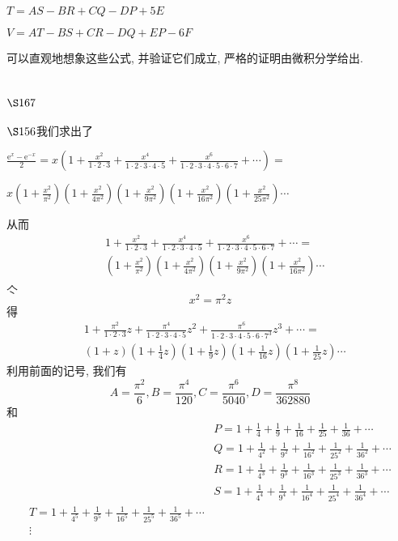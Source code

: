 $T=A S-B R+C Q-D P+5 E$

$V=A T-B S+C R-D Q+E P-6 F$

可以直观地想象这些公式, 并验证它们成立, 严格的证明由微积分学给出.

\section{$\S 167$}

$\S 156$我们求出了

$\frac{\mathrm{e}^{x}-\mathrm{e}^{-x}}{2}=x\left(1+\frac{x^{2}}{1 \cdot 2 \cdot 3}+\frac{x^{4}}{1 \cdot 2 \cdot 3 \cdot 4 \cdot 5}+\frac{x^{6}}{1 \cdot 2 \cdot 3 \cdot 4 \cdot 5 \cdot 6 \cdot 7}+\cdots\right)=$

$x\left(1+\frac{x^{2}}{\pi^{2}}\right)\left(1+\frac{x^{2}}{4 \pi^{2}}\right)\left(1+\frac{x^{2}}{9 \pi^{2}}\right)\left(1+\frac{x^{2}}{16 \pi^{2}}\right)\left(1+\frac{x^{2}}{25 \pi^{2}}\right) \cdots$

从而
\[
\begin{aligned}
& 1+\frac{x^{2}}{1 \cdot 2 \cdot 3}+\frac{x^{4}}{1 \cdot 2 \cdot 3 \cdot 4 \cdot 5}+\frac{x^{6}}{1 \cdot 2 \cdot 3 \cdot 4 \cdot 5 \cdot 6 \cdot 7}+\cdots= \\
& \left(1+\frac{x^{2}}{\pi^{2}}\right)\left(1+\frac{x^{2}}{4 \pi^{2}}\right)\left(1+\frac{x^{2}}{9 \pi^{2}}\right)\left(1+\frac{x^{2}}{16 \pi^{2}}\right) \cdots
\end{aligned}
\]
$\hat{亽}$
\[
x^{2}=\pi^{2} z
\]
得
\[
\begin{aligned}
& 1+\frac{\pi^{2}}{1 \cdot 2 \cdot 3} z+\frac{\pi^{4}}{1 \cdot 2 \cdot 3 \cdot 4 \cdot 5} z^{2}+\frac{\pi^{6}}{1 \cdot 2 \cdot 3 \cdot 4 \cdot 5 \cdot 6 \cdot 7^{3}} z^{3}+\cdots= \\
& (1+z)\left(1+\frac{1}{4} z\right)\left(1+\frac{1}{9} z\right)\left(1+\frac{1}{16} z\right)\left(1+\frac{1}{25} z\right) \cdots
\end{aligned}
\]
利用前面的记号, 我们有
\[
A=\frac{\pi^{2}}{6}, B=\frac{\pi^{4}}{120}, C=\frac{\pi^{6}}{5040}, D=\frac{\pi^{8}}{362880}
\]
和
\[
\begin{aligned}
& P=1+\frac{1}{4}+\frac{1}{9}+\frac{1}{16}+\frac{1}{25}+\frac{1}{36}+\cdots \\
& Q=1+\frac{1}{4^{2}}+\frac{1}{9^{2}}+\frac{1}{16^{2}}+\frac{1}{25^{2}}+\frac{1}{36^{2}}+\cdots \\
& R=1+\frac{1}{4^{3}}+\frac{1}{9^{3}}+\frac{1}{16^{3}}+\frac{1}{25^{3}}+\frac{1}{36^{3}}+\cdots \\
& S=1+\frac{1}{4^{4}}+\frac{1}{9^{4}}+\frac{1}{16^{4}}+\frac{1}{25^{4}}+\frac{1}{36^{4}}+\cdots\\
T=1+\frac{1}{4^5}+\frac{1}{9^5}+\frac{1}{16^5}+\frac{1}{25^5}+\frac{1}{36^5}+\cdots\\
\vdots
\end{aligned}
\]

